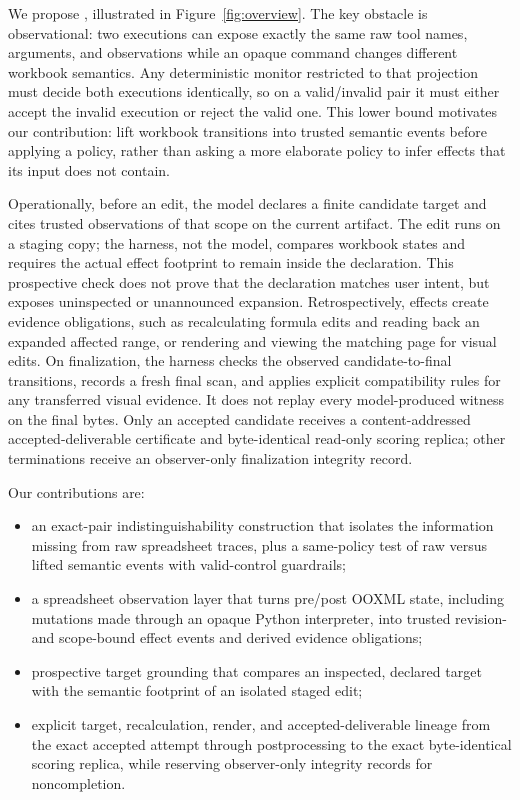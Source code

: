 We propose \method, illustrated in Figure~\ref{fig:overview}. The key obstacle
is observational: two executions can expose exactly the same raw tool names,
arguments, and observations while an opaque command changes different workbook
semantics. Any deterministic monitor restricted to that projection must decide
both executions identically, so on a valid/invalid pair it must either accept
the invalid execution or reject the valid one. This lower bound motivates our
contribution: lift workbook transitions into trusted semantic events before
applying a policy, rather than asking a more elaborate policy to infer effects
that its input does not contain.

Operationally, before an edit,
the model declares a finite candidate target and cites trusted observations of
that scope on the current artifact. The edit runs on a staging copy; the
harness, not the model, compares workbook states and requires the actual effect
footprint to remain inside the declaration. This prospective check does not
prove that the declaration matches user intent, but exposes uninspected or
unannounced expansion. Retrospectively, effects create evidence obligations,
such as recalculating formula edits and reading back an expanded affected
range, or rendering and viewing the matching page for visual edits. On
finalization, the harness checks the observed candidate-to-final transitions,
records a fresh final scan, and applies explicit compatibility rules for any
transferred visual evidence. It does not replay every model-produced witness
on the final bytes. Only an accepted candidate receives a content-addressed
accepted-deliverable certificate and byte-identical read-only scoring replica;
other terminations receive an observer-only finalization integrity record.



Our contributions are:

\begin{itemize}
  \item an exact-pair indistinguishability construction that isolates the
  information missing from raw spreadsheet traces, plus a same-policy test of
  raw versus lifted semantic events with valid-control guardrails;
  \item a spreadsheet observation layer that turns pre/post OOXML state,
  including mutations made through an opaque Python interpreter, into trusted
  revision- and scope-bound effect events and derived evidence obligations;
  \item prospective target grounding that compares an inspected, declared
  target with the semantic footprint of an isolated staged edit;
  \item explicit target, recalculation, render, and accepted-deliverable
  lineage from the exact accepted attempt through
  postprocessing to the exact byte-identical scoring replica, while reserving
  observer-only integrity records for noncompletion.
\end{itemize}

